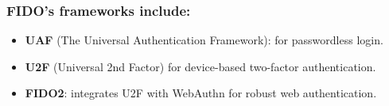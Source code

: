 \subsubsection{FIDO's frameworks include:}
\begin{itemize}
    \item \textbf{UAF} (The Universal Authentication Framework): for passwordless login.
    \item \textbf{U2F} (Universal 2nd Factor) for device-based two-factor authentication.
    \item \textbf{FIDO2}: integrates U2F with WebAuthn for robust web authentication.
\end{itemize}

























